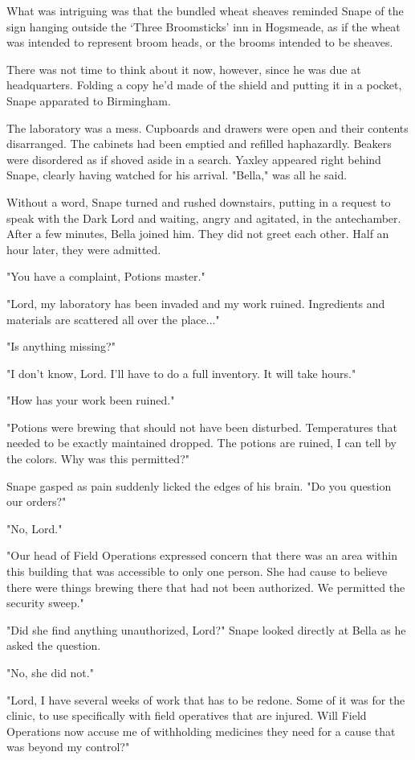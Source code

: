 \documentclass[a4paper,11pt]{article}
\begin{document}
What was intriguing was that the bundled wheat sheaves reminded Snape of the sign hanging outside the `Three Broomsticks' inn in Hogsmeade, as if the wheat was intended to represent broom heads, or the brooms intended to be sheaves.

There was not time to think about it now, however, since he was due at headquarters. Folding a copy he'd made of the shield and putting it in a pocket, Snape apparated to Birmingham.

The laboratory was a mess. Cupboards and drawers were open and their contents disarranged. The cabinets had been emptied and refilled haphazardly. Beakers were disordered as if shoved aside in a search. Yaxley appeared right behind Snape, clearly having watched for his arrival. "Bella," was all he said.

Without a word, Snape turned and rushed downstairs, putting in a request to speak with the Dark Lord and waiting, angry and agitated, in the antechamber. After a few minutes, Bella joined him. They did not greet each other. Half an hour later, they were admitted.

"You have a complaint, Potions master."

"Lord, my laboratory has been invaded and my work ruined. Ingredients and materials are scattered all over the place..."

"Is anything missing?"

"I don't know, Lord. I'll have to do a full inventory. It will take hours."

"How has your work been ruined."

"Potions were brewing that should not have been disturbed. Temperatures that needed to be exactly maintained dropped. The potions are ruined, I can tell by the colors. Why was this permitted?"

Snape gasped as pain suddenly licked the edges of his brain. "Do you question our orders?"

"No, Lord."

"Our head of Field Operations expressed concern that there was an area within this building that was accessible to only one person. She had cause to believe there were things brewing there that had not been authorized. We permitted the security sweep."

"Did she find anything unauthorized, Lord?" Snape looked directly at Bella as he asked the question.

"No, she did not."

"Lord, I have several weeks of work that has to be redone. Some of it was for the clinic, to use specifically with field operatives that are injured. Will Field Operations now accuse me of withholding medicines they need for a cause that was beyond my control?"
\end{document}
